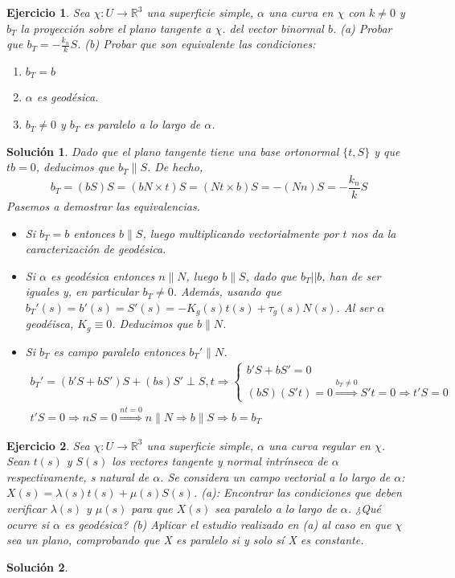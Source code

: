 \documentclass{article}
\theoremstyle{plain}
\newtheorem{exercise}{Ejercicio}
\newtheorem*{sol*}{Solución}
\newcommand{\R}{\mathbb{R}}
\newcommand{\X}{\chi}
\begin{document}
\newpage
\begin{exercise}
Sea $\X:U\rightarrow \R^3$ una superficie simple, $\alpha$ una curva en $\X$ con $k\neq 0$ y $b_T$ la proyección sobre el plano tangente a $\X$. del vector binormal $b$. (a) Probar que $b_T = -\frac{k_n}{k}S$. (b) Probar que son equivalente las condiciones:
\begin{enumerate}
\item $b_T = b$
\item $\alpha$ es geodésica.
\item $b_T \neq 0$ y $b_T$ es paralelo a lo largo de $\alpha$.
\end{enumerate}
\end{exercise}
\begin{sol*}
Dado que el plano tangente tiene una base ortonormal $\{t,S\}$ y que $tb=0$, deducimos que $b_T \parallel S$. De hecho,
\[
b_T = (bS)S = (b N\times t)S = (N t \times b)S = -(N n)S = -\frac{k_n}{k}S
\]
Pasemos a demostrar las equivalencias.
\begin{itemize}
\item Si $b_T = b$ entonces $b\parallel S$, luego multiplicando vectorialmente por $t$ nos da la caracterización de geodésica.
\item Si $\alpha$ es geodésica entonces $n\parallel N$, luego $b\parallel S$, dado que $b_T || b$, han de ser iguales y, en particular $b_T\neq 0$. Además, usando que $b_T'(s) = b'(s)=S'(s)=-K_g(s)t(s)+ \tau_g(s)N(s)$. Al ser $\alpha$ geodéisca, $K_g\equiv 0$. Deducimos que $b\parallel N$.
\item Si $b_T$ es campo paralelo entonces $b_T'\parallel N$.
\begin{gather*}
b_T' = (b'S+bS')S+(bs)S' \perp S,t \Rightarrow 
\begin{cases}
b'S+bS' = 0\\
(bS)(S't) = 0 \overset{b_T\neq 0}{\Rightarrow} S't = 0 \Rightarrow t'S = 0
\end{cases}\\
t'S = 0 \Rightarrow nS=0 \overset{nt=0}{\Rightarrow} n\parallel N \Rightarrow b\parallel S \Rightarrow b=b_T
\end{gather*}
\end{itemize} 
\end{sol*}


\newpage
\begin{exercise}
Sea $\X:U\rightarrow\R^3$ una superficie simple, $\alpha$ una curva regular en $\X$. Sean $t(s)$ y $S(s)$ los vectores tangente y normal intrínseca de $\alpha$ respectivamente, s natural de $\alpha$. Se considera un campo vectorial a lo largo de $\alpha$: $X(s)=\lambda(s)t(s)+\mu(s)S(s)$. (a): Encontrar las condiciones que deben verificar $\lambda(s)$ y $\mu(s)$ para que $X(s)$ sea paralelo a lo largo de $\alpha$. ¿Qué ocurre si $\alpha$ es geodésica? (b) Aplicar el estudio realizado en (a) al caso en que $\X$ sea un plano, comprobando que X es paralelo si y solo sí X es constante.
\end{exercise}
\begin{sol*}
\end{sol*}
\end{document}
